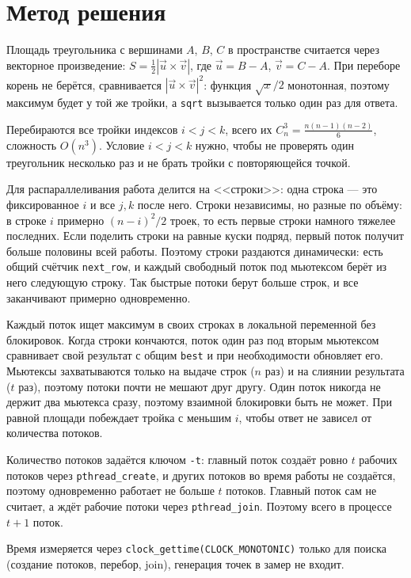 \section{Метод решения}
Площадь треугольника с вершинами $A$, $B$, $C$ в пространстве считается через векторное произведение: $S = \frac{1}{2}|\vec{u} \times \vec{v}|$, где $\vec{u} = B - A$, $\vec{v} = C - A$. При переборе корень не берётся, сравнивается $|\vec{u} \times \vec{v}|^2$: функция $\sqrt{x}/2$ монотонная, поэтому максимум будет у той же тройки, а \texttt{sqrt} вызывается только один раз для ответа.

Перебираются все тройки индексов $i < j < k$, всего их $C_n^3 = \frac{n(n-1)(n-2)}{6}$, сложность $O(n^3)$. Условие $i < j < k$ нужно, чтобы не проверять один треугольник несколько раз и не брать тройки с повторяющейся точкой.

Для распараллеливания работа делится на <<строки>>: одна строка --- это фиксированное $i$ и все $j, k$ после него. Строки независимы, но разные по объёму: в строке $i$ примерно $(n-i)^2/2$ троек, то есть первые строки намного тяжелее последних. Если поделить строки на равные куски подряд, первый поток получит больше половины всей работы. Поэтому строки раздаются динамически: есть общий счётчик \texttt{next\_row}, и каждый свободный поток под мьютексом берёт из него следующую строку. Так быстрые потоки берут больше строк, и все заканчивают примерно одновременно.

Каждый поток ищет максимум в своих строках в локальной переменной без блокировок. Когда строки кончаются, поток один раз под вторым мьютексом сравнивает свой результат с общим \texttt{best} и при необходимости обновляет его. Мьютексы захватываются только на выдаче строк ($n$ раз) и на слиянии результата ($t$ раз), поэтому потоки почти не мешают друг другу. Один поток никогда не держит два мьютекса сразу, поэтому взаимной блокировки быть не может. При равной площади побеждает тройка с меньшим $i$, чтобы ответ не зависел от количества потоков.

Количество потоков задаётся ключом \texttt{-t}: главный поток создаёт ровно $t$ рабочих потоков через \texttt{pthread\_create}, и других потоков во время работы не создаётся, поэтому одновременно работает не больше $t$ потоков. Главный поток сам не считает, а ждёт рабочие потоки через \texttt{pthread\_join}. Поэтому всего в процессе $t + 1$ поток.

Время измеряется через \texttt{clock\_gettime(CLOCK\_MONOTONIC)} только для поиска (создание потоков, перебор, join), генерация точек в замер не входит.

